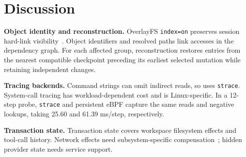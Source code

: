 \section{Discussion}

\textbf{Object identity and reconstruction.}
OverlayFS \texttt{index=on} preserves session hard-link
visibility~\cite{overlayfs}. Object identifiers and resolved paths link
accesses in the dependency graph. For each affected group, reconstruction
restores entries from the nearest compatible checkpoint preceding its earliest
selected mutation while retaining independent changes.

\textbf{Tracing backends.}
Command strings can omit indirect reads, so \system uses \texttt{strace}.
System-call tracing has workload-dependent cost and is Linux-specific.
In a 12-step probe, \texttt{strace} and persistent eBPF capture the same reads
and negative lookups, taking 25.60 and 61.39 ms/step, respectively.

\textbf{Transaction state.}
Transaction state covers workspace filesystem effects and tool-call history.
Network effects need subsystem-specific compensation~\cite{sagas}; hidden
provider state needs service support.
